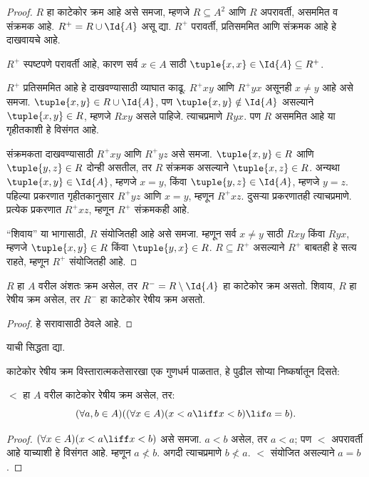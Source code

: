 \documentclass[../../../include/open-logic-section]{subfiles}
\begin{document}
\begin{proof}
$R$ हा काटेकोर क्रम आहे असे समजा, म्हणजे $R \subseteq A^2$ आणि $R$
अपरावर्ती, असममित व संक्रमक आहे. $R^+ = R \cup \Id{A}$ असू द्या.
$R^+$ परावर्ती, प्रतिसममित आणि संक्रमक आहे हे दाखवायचे आहे.

$R^+$ स्पष्टपणे परावर्ती आहे, कारण सर्व $x \in A$ साठी
$\tuple{x, x} \in \Id{A} \subseteq R^+$.

$R^+$ प्रतिसममित आहे हे दाखवण्यासाठी व्याघात काढू. $R^+xy$ आणि $R^+yx$
असूनही $x \neq y$ आहे असे समजा. $\tuple{x,y} \in R \cup \Id{A}$,
पण $\tuple{x, y} \notin \Id{A}$ असल्याने $\tuple{x, y} \in R$, म्हणजे
$Rxy$ असले पाहिजे. त्याचप्रमाणे $Ryx$. पण $R$ असममित आहे या
गृहीतकाशी हे विसंगत आहे.

संक्रमकता दाखवण्यासाठी $R^+xy$ आणि $R^+yz$ असे समजा.
$\tuple{x, y} \in R$ आणि $\tuple{y,z} \in R$ दोन्ही असतील, तर $R$
संक्रमक असल्याने $\tuple{x, z} \in R$. अन्यथा $\tuple{x, y} \in \Id{A}$,
म्हणजे $x = y$, किंवा $\tuple{y, z} \in \Id{A}$, म्हणजे $y = z$.
पहिल्या प्रकरणात गृहीतकानुसार $R^+yz$ आणि $x = y$, म्हणून $R^+xz$.
दुसऱ्या प्रकरणातही त्याचप्रमाणे. प्रत्येक प्रकरणात $R^+xz$, म्हणून
$R^+$ संक्रमकही आहे.

``शिवाय'' या भागासाठी, $R$ संयोजितही आहे असे समजा. म्हणून सर्व
$x \neq y$ साठी $Rxy$ किंवा $Ryx$, म्हणजे $\tuple{x, y} \in R$ किंवा
$\tuple{y, x} \in R$. $R \subseteq R^+$ असल्याने $R^+$ बाबतही हे सत्य
राहते, म्हणून $R^+$ संयोजितही आहे.
\end{proof}

\begin{prop}
$R$ हा $A$ वरील अंशतः क्रम असेल, तर $R^- = R \setminus \Id{A}$ हा
काटेकोर क्रम असतो. शिवाय, $R$ हा रेषीय क्रम असेल, तर $R^-$ हा काटेकोर
रेषीय क्रम असतो.
\end{prop}

\begin{proof}
हे सरावासाठी ठेवले आहे.
\end{proof}

\begin{prob}
 याची सिद्धता द्या.
\end{prob}

काटेकोर रेषीय क्रम विस्तारात्मकतेसारखा एक गुणधर्म पाळतात, हे पुढील
सोप्या निष्कर्षातून दिसते:

\begin{prop}
$<$ हा $A$ वरील काटेकोर रेषीय क्रम असेल, तर:
\[
  (\forall a, b \in A)((\forall x \in A)(x < a \liff x < b) \lif a = b).
\]
\end{prop}

\begin{proof}
$(\forall x \in A)(x < a \liff x < b)$ असे समजा. $a < b$ असेल, तर
$a < a$; पण $<$ अपरावर्ती आहे याच्याशी हे विसंगत आहे. म्हणून $a \nless b$.
अगदी त्याचप्रमाणे $b \nless a$. $<$ संयोजित असल्याने $a = b$.
\end{proof}
\end{document}

